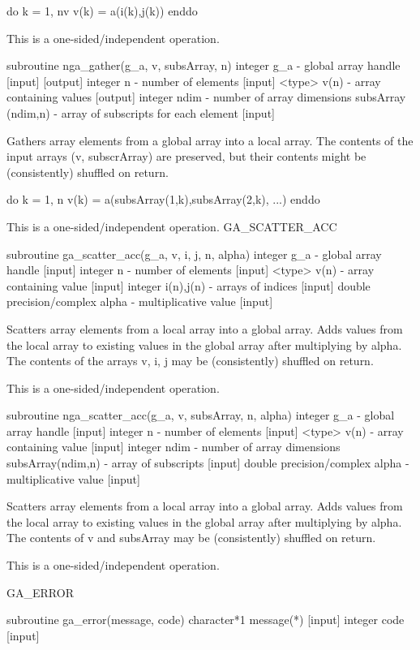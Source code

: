 do k = 1, nv v(k) = a(i(k),j(k)) enddo

This is a one-sided/independent operation.

subroutine nga\_gather(g\_a, v, subsArray, n) integer g\_a - global
array handle {[}input{]} {[}output{]} integer n - number of elements
{[}input{]} <type> v(n) - array containing values {[}output{]} integer
ndim - number of array dimensions subsArray (ndim,n) - array of subscripts
for each element {[}input{]}

Gathers array elements from a global array into a local array. The
contents of the input arrays (v, subscrArray) are preserved, but their
contents might be (consistently) shuffled on return.

do k = 1, n v(k) = a(subsArray(1,k),subsArray(2,k), ...) enddo

This is a one-sided/independent operation. GA\_SCATTER\_ACC

subroutine ga\_scatter\_acc(g\_a, v, i, j, n, alpha) integer g\_a
- global array handle {[}input{]} integer n - number of elements {[}input{]}
<type> v(n) - array containing value {[}input{]} integer i(n),j(n)
- arrays of indices {[}input{]} double precision/complex alpha - multiplicative
value {[}input{]} 

Scatters array elements from a local array into a global array. Adds
values from the local array to existing values in the global array
after multiplying by alpha. The contents of the arrays v, i, j may
be (consistently) shuffled on return.

This is a one-sided/independent operation.

subroutine nga\_scatter\_acc(g\_a, v, subsArray, n, alpha) integer
g\_a - global array handle {[}input{]} integer n - number of elements
{[}input{]} <type> v(n) - array containing value {[}input{]} integer
ndim - number of array dimensions subsArray(ndim,n) - array of subscripts
{[}input{]} double precision/complex alpha - multiplicative value
{[}input{]}

Scatters array elements from a local array into a global array. Adds
values from the local array to existing values in the global array
after multiplying by alpha. The contents of v and subsArray may be
(consistently) shuffled on return.

This is a one-sided/independent operation.

GA\_ERROR

subroutine ga\_error(message, code) character{*}1 message({*}) {[}input{]}
integer code {[}input{]}

